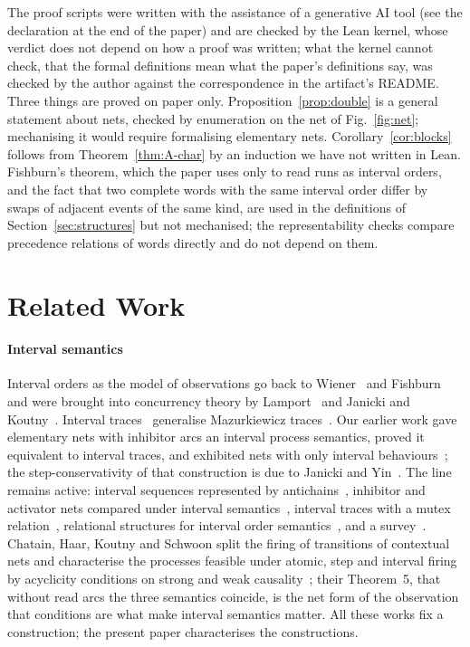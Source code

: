 \documentclass[preprint,12pt]{elsarticle}
\theoremstyle{plain}
\theoremstyle{definition}
\begin{document}
The proof scripts were written with the assistance of a generative AI tool (see the declaration at the end of the paper) and are checked by the Lean kernel, whose verdict does not depend on how a proof was written; what the kernel cannot check, that the formal definitions mean what the paper's definitions say, was checked by the author against the correspondence in the artifact's README. Three things are proved on paper only. Proposition~\ref{prop:double} is a general statement about nets, checked by enumeration on the net of Fig.~\ref{fig:net}; mechanising it would require formalising elementary nets. Corollary~\ref{cor:blocks} follows from Theorem~\ref{thm:A-char} by an induction we have not written in Lean. Fishburn's theorem, which the paper uses only to read runs as interval orders, and the fact that two complete words with the same interval order differ by swaps of adjacent events of the same kind, are used in the definitions of Section~\ref{sec:structures} but not mechanised; the representability checks compare precedence relations of words directly and do not depend on them.

\section{Related Work}
\label{sec:related}

\paragraph{Interval semantics}
Interval orders as the model of observations go back to Wiener~\cite{Wiener1914} and Fishburn~\cite{Fishburn1970,Fishburn1985} and were brought into concurrency theory by Lamport~\cite{Lamport1986} and Janicki and Koutny~\cite{JanickiKoutny1993,JanickiKoutny1997}. Interval traces~\cite{JanickiYinZubkova2012,JanickiYin2017} generalise Mazurkiewicz traces~\cite{BookOfTraces1995}. Our earlier work gave elementary nets with inhibitor arcs an interval process semantics, proved it equivalent to interval traces, and exhibited nets with only interval behaviours~\cite{AlqarniJanicki2015,AlqarniJanicki2018,Alqarni2016}; the step-conservativity of that construction is due to Janicki and Yin~\cite{JanickiYin2017}. The line remains active: interval sequences represented by antichains~\cite{Janicki2018}, inhibitor and activator nets compared under interval semantics~\cite{Janicki2019}, interval traces with a mutex relation~\cite{JanickiKoutnyMikulski2023}, relational structures for interval order semantics~\cite{JanickiKleijnKoutnyMikulski2024}, and a survey~\cite{JanickiKleijnKoutnyMikulski2026}. Chatain, Haar, Koutny and Schwoon split the firing of transitions of contextual nets and characterise the processes feasible under atomic, step and interval firing by acyclicity conditions on strong and weak causality~\cite{ChatainHaarKoutnySchwoon2015}; their Theorem~5, that without read arcs the three semantics coincide, is the net form of the observation that conditions are what make interval semantics matter. All these works fix a construction; the present paper characterises the constructions.
\end{document}
